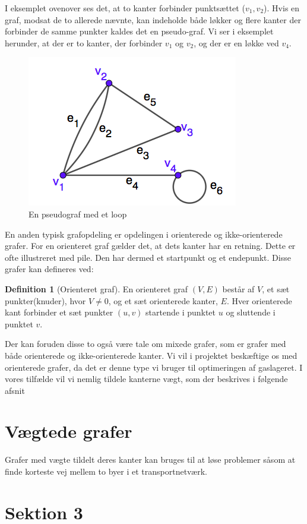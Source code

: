 \documentclass[11pt,a4paper,twoside,openright,danish]{book}
\theoremstyle{definition}
\newtheorem{definition}
{Definition}[section]
\begin{document}
I eksemplet ovenover ses det, at to kanter forbinder punktsættet ($v_{1},v_{2}$). Hvis en graf, modsat de to allerede nævnte, kan indeholde både løkker og flere kanter der forbinder de samme punkter kaldes det en pseudo-graf. Vi ser i eksemplet herunder, at der er to kanter, der forbinder $v_{1}$ og $v_{2}$, og der er en løkke ved $v_{4}$.
\begin{figure}[H]
\centering
\includegraphics[scale=0.5]{pseudograf.png}
\caption{En pseudograf med et loop}
\label{fig:pseudo}
\end{figure}
En anden typisk grafopdeling er opdelingen i orienterede og ikke-orienterede grafer. For en orienteret graf gælder det, at dets kanter har en retning. Dette er ofte illustreret med pile. Den har dermed et startpunkt og et endepunkt. Disse grafer kan defineres ved:
\begin{definition}
[Orienteret graf] 
En orienteret graf $(V,E)$ består af $V$, et sæt punkter(knuder), hvor $V\neq0$, og et sæt orienterede kanter, $E$. Hver orienterede kant forbinder et sæt punkter $(u,v)$ startende i punktet $u$ og sluttende i punktet $v$.
\end{definition}
Der kan foruden disse to også være tale om mixede grafer, som er grafer med både orienterede og ikke-orienterede kanter. Vi vil i projektet beskæftige os med orienterede grafer, da det er denne type vi bruger til optimeringen af gaslageret. I vores tilfælde vil vi nemlig tildele kanterne vægt, som der beskrives i følgende afsnit


\section{Vægtede grafer}
Grafer med vægte tildelt deres kanter kan bruges til at løse problemer såsom at finde korteste vej mellem to byer i et transportnetværk. 

\section{Sektion 3}
\end{document}
